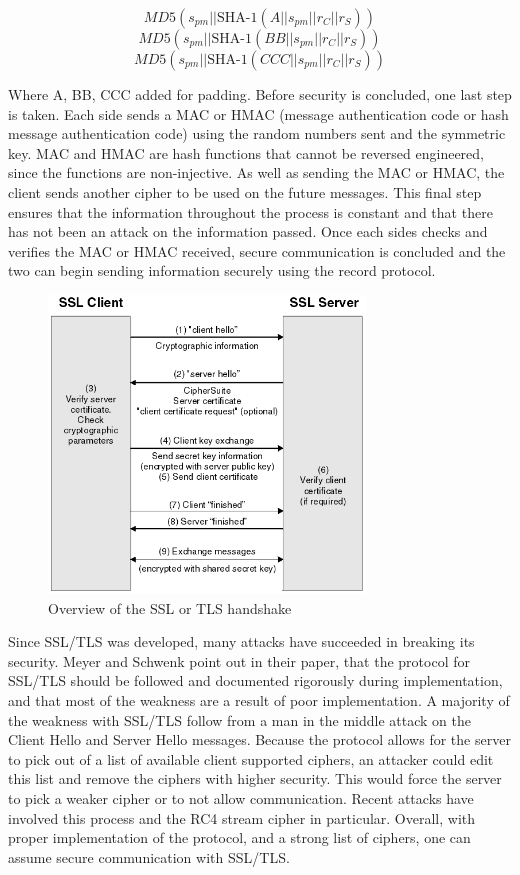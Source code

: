 \[ MD5(s_{pm}||\text{SHA-1}(A||s_{pm}||r_{C}||r_{S})) \]
\[ MD5(s_{pm}||\text{SHA-1}(BB||s_{pm}||r_{C}||r_{S})) \]
\[ MD5(s_{pm}||\text{SHA-1}(CCC||s_{pm}||r_{C}||r_{S})) \] 

Where A, BB, CCC added for padding\cite[p. 282]{trappe}.  Before security is
concluded, one last step is taken.  Each side sends a MAC or HMAC (message
authentication code or hash message authentication code) using the random
numbers sent and the symmetric key.  MAC and HMAC are hash functions that
cannot be reversed engineered, since the functions are non-injective.  As well
as sending the MAC or HMAC, the client sends another cipher to be used on the
future messages.  This final step ensures that the information throughout the
process is constant and that there has not been an attack on the information
passed.  Once each sides checks and verifies the MAC or HMAC received, secure
communication is concluded and the two can begin sending information
securely using the record protocol\cite[p. 58]{rescorla}.

\begin{figure}[h!]
    \caption{Overview of the SSL or TLS handshake\cite{ibm}} \label{Handshake}
    \centering
        \includegraphics[width=0.75\textwidth]{SSL_TLS_Diagram.png}
\end{figure}

Since SSL/TLS was developed, many attacks have succeeded in breaking its
security.  Meyer and Schwenk point out in their paper, that the protocol for
SSL/TLS should be followed and documented rigorously during implementation, and
that most of the weakness are a result of poor implementation\cite[p.
14]{meyer}.  A majority of the weakness with SSL/TLS follow from a man in the
middle attack on the Client Hello and Server Hello messages.  Because the
protocol allows for the server to pick out of a list of available client
supported ciphers, an attacker could edit this list and remove the ciphers with
higher security.  This would force the server to pick a weaker cipher or to not
allow communication.  Recent attacks have involved this process and the RC4
stream cipher in particular.  Overall, with proper implementation of the
protocol, and a strong list of ciphers,  one can assume secure communication
with SSL/TLS.
